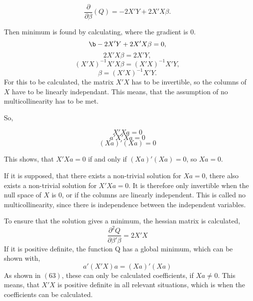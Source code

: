 \begin{equation}
\frac{\partial}{\partial \beta}(Q)=-2 X' Y + 2X' X \beta .
\end{equation}

\noindent Then minimum is found by calculating, where the gradient is 0.
\begin{equation}\b-2 X' Y+ 2X' X \beta =0,\end{equation}
\begin{equation} 2X' X \beta = 2X' Y,\end{equation}
\begin{equation}(X' X)^{-1} X' X \beta = (X' X)^{-1} X' Y,\end{equation}
\begin{equation} \beta=(X' X)^{-1} X' Y.\end{equation}
  For this to be calculated, the matrix $X' X$ has to be invertible, so the columns of $X$ have to be linearly independant.
 This means, that the assumption of no multicollinearity has to be met.
 
 \noindent So, 
 
\begin{equation}
 	X' Xa  =0
\end{equation}
\begin{equation}
 	a' X' X a =0
\end{equation}
\begin{equation}
 	(Xa)'(Xa)=0
\end{equation}
 
 \noindent This shows, that $X'Xa=0$ if and only if $(Xa)'(Xa)=0$, so $Xa=0$. 
 
 \noindent If it is supposed, that there exists a non-trivial solution for $Xa=0$, there also exists a non-trivial solution for $X'Xa=0$. It is therefore only invertible when the null space of $X$ is 0, or if the columns are linearly independent. This is called no multicollinearity, since there is independence between the independent variables. 
 
\noindent To ensure that the solution gives a minimum, the hessian matrix is calculated,
\begin{equation}
 \frac{\partial^2 Q}{\partial \beta' \beta}=2X'X
\end{equation} 
 \noindent If it is positive definite, the function Q has a global minimum, which can be shown with,
\begin{equation}
 a' (X' X)a = (Xa)' (Xa)
\end{equation}  
 \noindent As shown in $(63)$,
 these can only be calculated coefficients, if $Xa \not= 0$. This means, that $X'X$ is positive definite in all relevant situations, which is when the coefficients can be calculated. 
 
